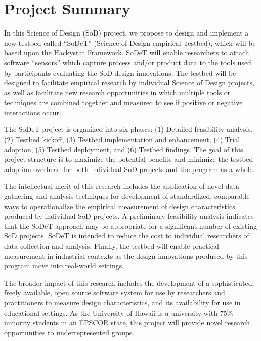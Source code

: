 \documentclass[11pt]{article}
\begin{document}
\section*{Project Summary}
In this Science of Design (SoD) project, we propose to design and implement
a new testbed called ``SoDeT'' (Science of Design empirical Testbed), which
will be based upon the Hackystat Framework.  SoDeT will enable researchers
to attach software ``sensors''  which capture process and/or product data
to the tools used by participants evaluating the SoD design innovations.  The
testbed will be designed to facilitate empirical research by individual
Science of Design projects, as well as facilitate new research
opportunities in which multiple tools or techniques are combined together
and measured to see if positive or negative interactions occur.

The SoDeT project is organized into six phases: (1) Detailed
feasibility analysis, (2) Testbed kickoff, (3) Testbed implementation and
enhancement, (4) Trial adoption, (5) Testbed deployment, and (6) Testbed
findings.  The goal of this project structure is to maximize the potential
benefits and minimize the testbed adoption overhead for both individual SoD
projects and the program as a whole.

The intellectual merit of this research includes the application of novel
data gathering and analysis techniques for development of standardized,
comparable ways to operationalize the empirical measurement of design
characteristics produced by individual SoD projects. A preliminary
feasibility analysis indicates that the SoDeT approach may be appropriate
for a significant number of existing SoD projects.  SoDeT is intended to
reduce the cost to individual researchers of data collection and
analysis. Finally, the testbed will enable practical measurement in
industrial contexts as the design innovations produced by this program move
into real-world settings.

The broader impact of this research includes the development of a
sophisticated, freely available, open source software system for use by
researchers and practitioners to measure design characteristics, 
and its availability for use in educational settings.  As the University
of Hawaii is a university with 75\% minority students in an EPSCOR state,
this project will provide novel research opportunities to underrepresented
groups.
\end{document}
